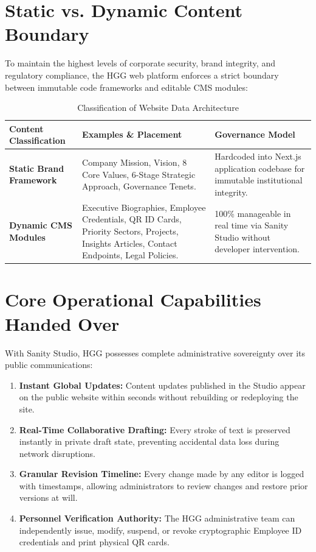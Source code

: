 \documentclass[11pt,a4paper,oneside]{book}
\begin{document}
\section{Static vs. Dynamic Content Boundary}
To maintain the highest levels of corporate security, brand integrity, and regulatory compliance, the HGG web platform enforces a strict boundary between immutable code frameworks and editable CMS modules:

\begin{table}[H]
\centering
\small
\begin{tabularx}{\textwidth}{lXX}
  \toprule
  \textbf{Content Classification} & \textbf{Examples \& Placement} & \textbf{Governance Model} \\
  \midrule
  \textbf{Static Brand Framework} & Company Mission, Vision, 8 Core Values, 6-Stage Strategic Approach, Governance Tenets. & Hardcoded into Next.js application codebase for immutable institutional integrity. \\
  \addlinespace[3pt]
  \textbf{Dynamic CMS Modules} & Executive Biographies, Employee Credentials, QR ID Cards, Priority Sectors, Projects, Insights Articles, Contact Endpoints, Legal Policies. & 100\% manageable in real time via Sanity Studio without developer intervention. \\
  \bottomrule
\end{tabularx}
\caption{Classification of Website Data Architecture}
\label{tab:content_boundary}
\end{table}

\section{Core Operational Capabilities Handed Over}
With Sanity Studio, HGG possesses complete administrative sovereignty over its public communications:
\begin{enumerate}
  \item \textbf{Instant Global Updates:} Content updates published in the Studio appear on the public website within seconds without rebuilding or redeploying the site.
  \item \textbf{Real-Time Collaborative Drafting:} Every stroke of text is preserved instantly in private draft state, preventing accidental data loss during network disruptions.
  \item \textbf{Granular Revision Timeline:} Every change made by any editor is logged with timestamps, allowing administrators to review changes and restore prior versions at will.
  \item \textbf{Personnel Verification Authority:} The HGG administrative team can independently issue, modify, suspend, or revoke cryptographic Employee ID credentials and print physical QR cards.
\end{enumerate}
\end{document}
